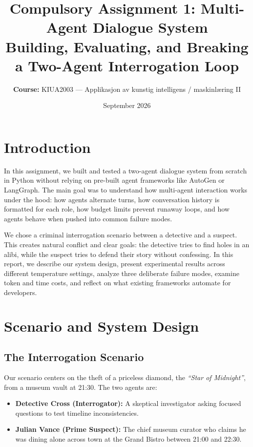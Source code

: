 \documentclass[11pt,a4paper]{article}
\title{\textbf{Compulsory Assignment 1: Multi-Agent Dialogue System}\\[0.4ex]
\large Building, Evaluating, and Breaking a Two-Agent Interrogation Loop}
\author{\textbf{Course:} KIUA2003 — Applikasjon av kunstig intelligens / maskinl\ae{}ring II}
\date{September 2026}
\begin{document}
\maketitle

\section{Introduction}

In this assignment, we built and tested a two-agent dialogue system from scratch in Python without relying on pre-built agent frameworks like AutoGen or LangGraph. The main goal was to understand how multi-agent interaction works under the hood: how agents alternate turns, how conversation history is formatted for each role, how budget limits prevent runaway loops, and how agents behave when pushed into common failure modes.

We chose a criminal interrogation scenario between a detective and a suspect. This creates natural conflict and clear goals: the detective tries to find holes in an alibi, while the suspect tries to defend their story without confessing. In this report, we describe our system design, present experimental results across different temperature settings, analyze three deliberate failure modes, examine token and time costs, and reflect on what existing frameworks automate for developers.

\section{Scenario and System Design}

\subsection{The Interrogation Scenario}
Our scenario centers on the theft of a priceless diamond, the \textit{``Star of Midnight''}, from a museum vault at 21:30. The two agents are:
\begin{itemize}
    \item \textbf{Detective Cross (Interrogator):} A skeptical investigator asking focused questions to test timeline inconsistencies.
    \item \textbf{Julian Vance (Prime Suspect):} The chief museum curator who claims he was dining alone across town at the Grand Bistro between 21:00 and 22:30.
\end{itemize}
\end{document}
